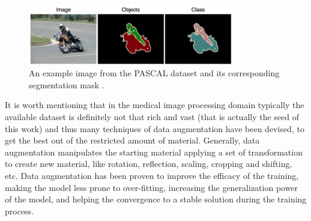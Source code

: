     \begin{figure}
        \centering
        \includegraphics[width = 0.8\textwidth]{images/PASCAL}
        \caption{An example image from the PASCAL dataset and its corresponding segmentation mask \cite{PASCAL}.}
        \label{fig:PASCAL}
    \end{figure}

It is worth mentioning that in the medical image processing domain typically the available dataset is definitely not that rich and vast (that is actually the seed of this work) and thus many techniques of data augmentation have been devised, to get the best out of the restricted amount of material. Generally, data augmentation manipulates the starting material applying a set of transformation to create new material, like rotation, reflection, scaling, cropping and shifting, etc. Data augmentation has been proven to improve the efficacy of the training, making the model less prone to over-fitting, increasing the generalization power of the model, and helping the convergence to a stable solution during the training process.

\clearpage

